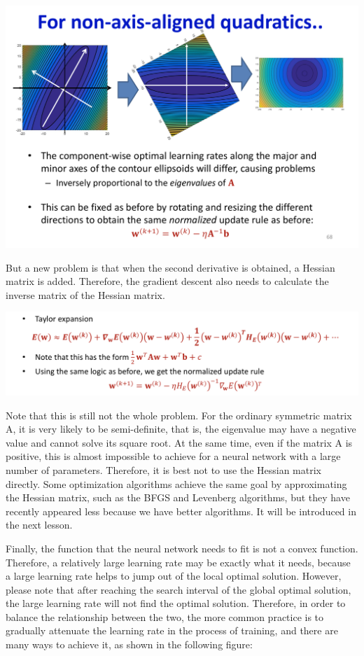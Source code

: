 \documentclass{article}
\begin{document}
	
	\includegraphics[scale=0.2]{78.png}
	
	But a new problem is that when the second derivative is obtained, a Hessian matrix is added. Therefore, the gradient descent also needs to calculate the inverse matrix of the Hessian matrix.
	
	
	\includegraphics[scale=0.2]{79.png}
	
	Note that this is still not the whole problem. For the ordinary symmetric matrix A, it is very likely to be semi-definite, that is, the eigenvalue may have a negative value and cannot solve its square root. At the same time, even if the matrix A is positive, this is almost impossible to achieve for a neural network with a large number of parameters. Therefore, it is best not to use the Hessian matrix directly. Some optimization algorithms achieve the same goal by approximating the Hessian matrix, such as the BFGS and Levenberg algorithms, but they have recently appeared less because we have better algorithms. It will be introduced in the next lesson.
	
	Finally, the function that the neural network needs to fit is not a convex function. Therefore, a relatively large learning rate may be exactly what it needs, because a large learning rate helps to jump out of the local optimal solution. However, please note that after reaching the search interval of the global optimal solution, the large learning rate will not find the optimal solution. Therefore, in order to balance the relationship between the two, the more common practice is to gradually attenuate the learning rate in the process of training, and there are many ways to achieve it, as shown in the following figure:
	
\end{document}
